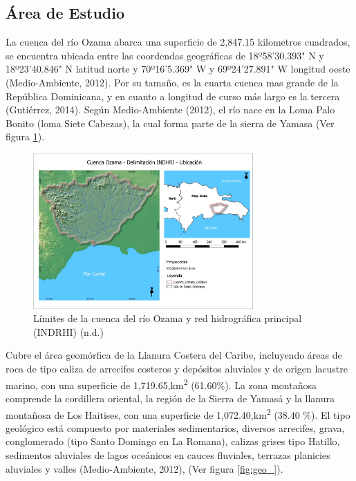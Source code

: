 \documentclass[11pt,]{article}
\begin{document}
\subsection{Área de Estudio}\label{uxe1rea-de-estudio}

La cuenca del río Ozama abarca una superficie de 2,847.15 kilometros
cuadrados, se encuentra ubicada entre las coordendas geográficas de
18º58'30.393" N y 18º23'40.846" N latitud norte y 70º16'5.369" W y
69º24'27.891" W longitud oeste (Medio-Ambiente, 2012). Por su tamaño, es
la cuarta cuenca mas grande de la República Dominicana, y en cuanto a
longitud de curso más largo es la tercera (Gutiérrez, 2014). Según
Medio-Ambiente (2012), el río nace en la Loma Palo Bonito (loma Siete
Cabezas), la cual forma parte de la sierra de Yamasa (Ver figura
\ref{fig:ubi-indrhi}).

\begin{figure}
\centering
\includegraphics[width=0.75000\textwidth]{Productos Generados/Mapa Final_page-0001.jpg}
\caption{\label{fig:ubi-indrhi}Límites de la cuenca del río Ozama y red
hidrográfica principal (INDRHI) (n.d.)}
\end{figure}

Cubre el área geomórfica de la Llanura Costera del Caribe, incluyendo
áreas de roca de tipo caliza de arrecifes costeros y depósitos aluviales
y de origen lacustre marino, con una superficie de
1,719.65,km\textsuperscript{2} (61.60\%). La zona montañosa comprende la
cordillera oriental, la región de la Sierra de Yamasá y la llanura
montañosa de Los Haitises, con una superficie de
1,072.40,km\textsuperscript{2} (38.40 \%). El tipo geológico está
compuesto por materiales sedimentarios, diversos arrecifes, grava,
conglomerado (tipo Santo Domingo en La Romana), calizas grises tipo
Hatillo, sedimentos aluviales de lagos oceánicos en cauces fluviales,
terrazas planicies aluviales y valles (Medio-Ambiente, 2012), (Ver
figura \ref{fig:geo_}).
\end{document}
